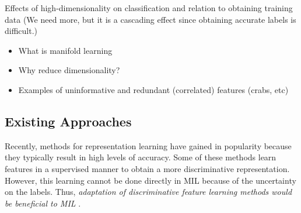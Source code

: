 Effects of high-dimensionality on classification and relation to obtaining training data (We need more, but it is a cascading effect since obtaining accurate labels is difficult.)

\begin{itemize}
	\item What is manifold learning
	\item Why reduce dimensionality?
	\item Examples of uninformative and redundant (correlated) features (crabs, etc)
\end{itemize}

\subsection{Existing Approaches}
Recently, methods for representation learning have gained in popularity because they typically result in high levels of accuracy.  Some of these methods  learn features in a supervised manner to obtain a more discriminative representation.  However, this learning cannot be done directly in  MIL because of the uncertainty on the labels.  Thus, \textit{adaptation of discriminative  feature learning methods would be beneficial to MIL} \cite{Carbonneau2016MILSurvey}.

